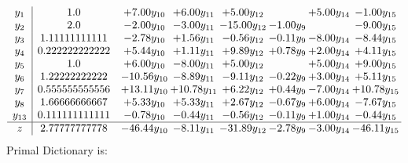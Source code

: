 \documentclass[9pt]{article}
\begin{document}
\[\begin{array}{c| c c@{\hskip 2pt} c@{\hskip 2pt} c@{\hskip 2pt} c@{\hskip 2pt} c@{\hskip 2pt} c@{\hskip 2pt} }
 y_{1}   &  1.0 & +  7.00 y_{10} & +  6.00 y_{11} & +  5.00 y_{12} &   & +  5.00 y_{14} & -1.00 y_{15}\\
 y_{2}   &  2.0 & -2.00 y_{10} & -3.00 y_{11} & -15.00 y_{12} & -1.00 y_{9} &   & -9.00 y_{15}\\
 y_{3}   &  1.11111111111 & -2.78 y_{10} & +  1.56 y_{11} & -0.56 y_{12} & -0.11 y_{9} & -8.00 y_{14} & -8.44 y_{15}\\
 y_{4}   &  0.222222222222 & +  5.44 y_{10} & +  1.11 y_{11} & +  9.89 y_{12} & +  0.78 y_{9} & +  2.00 y_{14} & +  4.11 y_{15}\\
 y_{5}   &  1.0 & +  6.00 y_{10} & -8.00 y_{11} & +  5.00 y_{12} &   & +  5.00 y_{14} & +  9.00 y_{15}\\
 y_{6}   &  1.22222222222 & -10.56 y_{10} & -8.89 y_{11} & -9.11 y_{12} & -0.22 y_{9} & +  3.00 y_{14} & +  5.11 y_{15}\\
 y_{7}   &  0.555555555556 & + 13.11 y_{10} & + 10.78 y_{11} & +  6.22 y_{12} & +  0.44 y_{9} & -7.00 y_{14} & + 10.78 y_{15}\\
 y_{8}   &  1.66666666667 & +  5.33 y_{10} & +  5.33 y_{11} & +  2.67 y_{12} & -0.67 y_{9} & +  6.00 y_{14} & -7.67 y_{15}\\
 y_{13}   &  0.111111111111 & -0.78 y_{10} & -0.44 y_{11} & -0.56 y_{12} & -0.11 y_{9} & +  1.00 y_{14} & -0.44 y_{15}\\
\hline
z    &  2.77777777778 & -46.44 y_{10} & -8.11 y_{11} & -31.89 y_{12} & -2.78 y_{9} & -3.00 y_{14} & -46.11 y_{15}\\
\end{array}\]
Primal Dictionary is:
\end{document}
